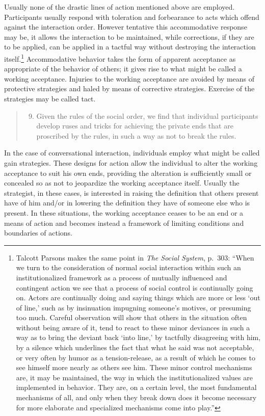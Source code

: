 \documentclass[openany,nobib]{tufte-book}
\begin{document}
Usually none of the drastic lines of action mentioned above are
employed. Participants usually respond with toleration and forbearance
to acts which offend against the interaction order. However tentative
this accommodative response may be, it allows the interaction to be
maintained, while corrections, if they are to be applied, can be applied
in a tactful way without destroying the interaction itself.\footnote{Talcott
  Parsons makes the same point in \emph{The Social System}, p.~303:
  ``When we turn to the consideration of normal social interaction
  within such an institutionalized framework as a process of mutually
  influenced and contingent action we see that a process of social
  control is continually going on. Actors are continually doing and
  saying things which are more or less `out of line,' such as by
  insinuation impugning someone's motives, or presuming too much.
  Careful observation will show that others in the situation often
  without being aware of it, tend to react to these minor deviances in
  such a way as to bring the deviant back `into line,' by tactfully
  disagreeing with him, by a silence which underlines the fact that what
  he said was not acceptable, or very often by humor as a
  tension-release, as a result of which he comes to see himself more
  nearly as others see him. These minor control mechanisms are, it may
  be maintained, the way in which the institutionalized values are
  implemented in behavior. They are, on a certain level, the most
  fundamental mechanisms of all, and only when they break down does it
  become necessary for more elaborate and specialized mechanisms come
  into play.''} Accommodative behavior takes the form of apparent
acceptance as appropriate of the behavior of others; it gives rise to
what might be called a working acceptance. Injuries to the working
acceptance are avoided by means of protective strategies and haled by
means of corrective strategies. Exercise of the strategies may be called
tact.

\begin{quote}
\begin{enumerate}
\setcounter{enumi}{8}
\item
  Given the rules of the social order, we find that individual
  participants develop ruses and tricks for achieving the private ends
  that are proscribed by the rules, in such a way as not to break the
  rules.
\end{enumerate}
\end{quote}

\noindent In the case of conversational interaction, individuals employ what might
be called gain strategies. These designs for action allow the individual
to alter the working acceptance to suit his own ends, providing the
alteration is sufficiently small or concealed so as not to jeopardize
the working acceptance itself. Usually the strategist, in these cases,
is interested in raising the definition that others present have of him
and/or in lowering the definition they have of someone else who is
present. In these situations, the working acceptance ceases to be an end
or a means of action and becomes instead a framework of limiting
conditions and boundaries of actions.
\end{document}
